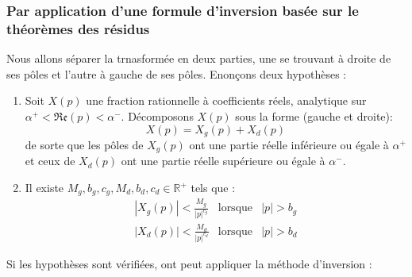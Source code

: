 \subsubsection{Par application d'une formule d'inversion basée sur le théorèmes des 
résidus}
Nous allons séparer la trnasformée en deux parties, une se trouvant à droite de ses
pôles et l'autre à gauche de ses pôles.
Enonçons deux hypothèses : 
\begin{enumerate}
	\item Soit $X(p)$ une fraction rationnelle à coefficients réels, analytique sur $\alpha^+ <
	      \mathfrak{Re}(p) < \alpha^-$. Décomposons $X(p)$ sous la forme (gauche et droite):
	      \begin{equation}
	      	X(p) = X_g(p) +X_d(p)
	      \end{equation}
	      de sorte que les pôles de $X_g(p)$ ont une partie réelle inférieure ou égale à $\alpha^+$ 
	      et ceux de $X_d(p)$ ont une partie réelle supérieure ou égale à $\alpha^-$.
	\item Il existe $M_g, b_g, c_g,M_d, b_d, c_d \in \mathbb{R}^+$ tels que :
	      \begin{equation}
	      	\begin{array}{lll}
	      		|X_g(p)| < \frac{M_g}{|p|^{c_g}} & \text{lorsque} & |p| > b_g \\
	      		|X_d(p)| < \frac{M_d}{|p|^{c_d}} & \text{lorsque} & |p| > b_d 
	      	\end{array}
	      \end{equation}
\end{enumerate}
Si les hypothèses sont vérifiées, ont peut appliquer la méthode d'inversion :\\
		
\ \\
		
